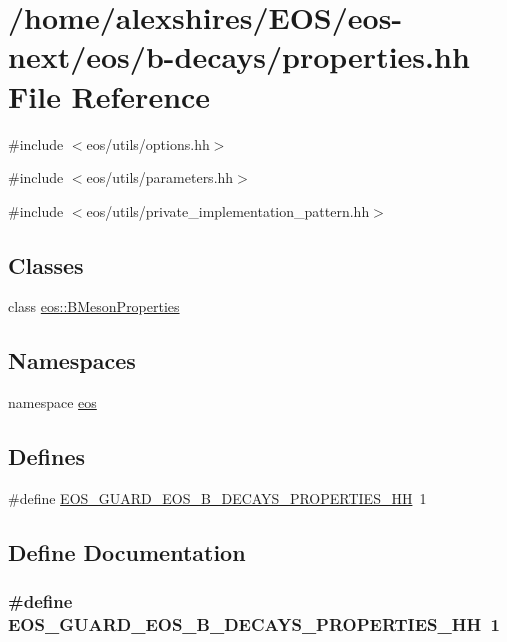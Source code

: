 \hypertarget{properties_8hh}{
\section{/home/alexshires/EOS/eos-\/next/eos/b-\/decays/properties.hh File Reference}
\label{properties_8hh}
}
{\ttfamily \#include $<$eos/utils/options.hh$>$}\par
{\ttfamily \#include $<$eos/utils/parameters.hh$>$}\par
{\ttfamily \#include $<$eos/utils/private\_\-implementation\_\-pattern.hh$>$}\par
\subsection*{Classes}
\begin{DoxyCompactItemize}
\item 
class \hyperlink{classeos_1_1BMesonProperties}{eos::BMesonProperties}
\end{DoxyCompactItemize}
\subsection*{Namespaces}
\begin{DoxyCompactItemize}
\item 
namespace \hyperlink{namespaceeos}{eos}
\end{DoxyCompactItemize}
\subsection*{Defines}
\begin{DoxyCompactItemize}
\item 
\#define \hyperlink{properties_8hh_ae13950a36229777e5e175c9daa98c106}{EOS\_\-GUARD\_\-EOS\_\-B\_\-DECAYS\_\-PROPERTIES\_\-HH}~1
\end{DoxyCompactItemize}


\subsection{Define Documentation}
\hypertarget{properties_8hh_ae13950a36229777e5e175c9daa98c106}{
\subsubsection[{EOS\_\-GUARD\_\-EOS\_\-B\_\-DECAYS\_\-PROPERTIES\_\-HH}]{\setlength{\rightskip}{0pt plus 5cm}\#define EOS\_\-GUARD\_\-EOS\_\-B\_\-DECAYS\_\-PROPERTIES\_\-HH~1}}
\label{properties_8hh_ae13950a36229777e5e175c9daa98c106}
